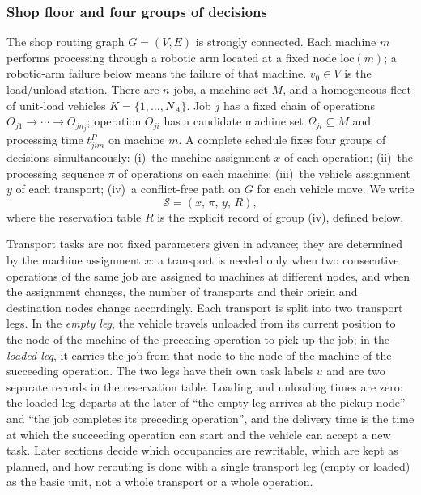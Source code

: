\documentclass[manuscript,screen,review]{acmart}
\begin{document}
\subsubsection{Shop floor and four groups of decisions}
\label{sec:shop}

The shop routing graph \(G=(V,E)\) is strongly connected. Each machine \(m\) performs processing through a robotic arm located at a fixed node \(\mathrm{loc}(m)\);
a robotic-arm failure below means the failure of that machine.
\(v_0\in V\) is the load/unload station. There are \(n\) jobs, a machine set \(M\), and a homogeneous fleet of unit-load vehicles
\(K=\{1,\ldots,N_A\}\). Job \(j\) has a fixed chain of operations \(O_{j1}\to\cdots\to O_{jn_j}\);
operation \(O_{ji}\) has a candidate machine set \(\Omega_{ji}\subseteq M\) and processing time
\(t^P_{jim}\) on machine \(m\). A complete schedule fixes four groups of decisions simultaneously:
(i)~the machine assignment \(x\) of each operation;
(ii)~the processing sequence \(\pi\) of operations on each machine;
(iii)~the vehicle assignment \(y\) of each transport;
(iv)~a conflict-free path on \(G\) for each vehicle move.
We write
\[
\mathcal{S}=(x,\,\pi,\,y,\,R),
\]
where the reservation table \(R\) is the explicit record of group (iv), defined below.

Transport tasks are not fixed parameters given in advance; they are determined by the machine assignment \(x\):
a transport is needed only when two consecutive operations of the same job are assigned to machines at different nodes,
and when the assignment changes, the number of transports and their origin and destination nodes change accordingly.
Each transport is split into two transport legs. In the \emph{empty leg}, the vehicle travels unloaded from its current position to the node of the machine of the preceding operation to pick up the job;
in the \emph{loaded leg}, it carries the job from that node to the node of the machine of the succeeding operation.
The two legs have their own task labels \(u\) and are two separate records in the reservation table.
Loading and unloading times are zero: the loaded leg departs at the later of ``the empty leg arrives at the pickup node'' and ``the job completes its preceding operation'',
and the delivery time is the time at which the succeeding operation can start and the vehicle can accept a new task.
Later sections decide which occupancies are rewritable, which are kept as planned, and how rerouting is done with a single transport leg (empty or loaded) as the basic unit,
not a whole transport or a whole operation.
\end{document}

